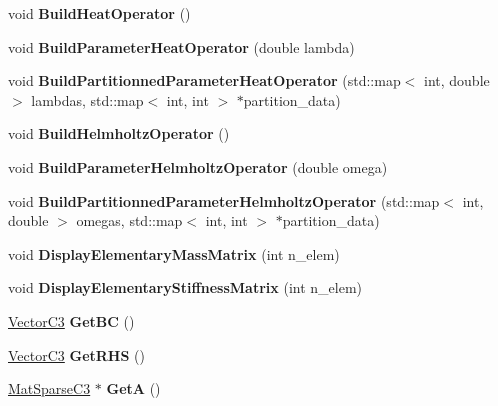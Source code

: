 \begin{DoxyCompactItemize}
\item 
void {\bfseries Build\+Heat\+Operator} ()\hypertarget{class_f_e_problem_a28324e797fb63c2eb6f1290961707c5c}{}\label{class_f_e_problem_a28324e797fb63c2eb6f1290961707c5c}

\item 
void {\bfseries Build\+Parameter\+Heat\+Operator} (double lambda)\hypertarget{class_f_e_problem_a7e5f1a4a65eb0d6aed9dbabf92bc0da8}{}\label{class_f_e_problem_a7e5f1a4a65eb0d6aed9dbabf92bc0da8}

\item 
void {\bfseries Build\+Partitionned\+Parameter\+Heat\+Operator} (std\+::map$<$ int, double $>$ lambdas, std\+::map$<$ int, int $>$ $\ast$partition\+\_\+data)\hypertarget{class_f_e_problem_a8f31694c860f6c4328435a03ba49a16f}{}\label{class_f_e_problem_a8f31694c860f6c4328435a03ba49a16f}

\item 
void {\bfseries Build\+Helmholtz\+Operator} ()\hypertarget{class_f_e_problem_abf351263b822451ef3a9e426c5a24fb3}{}\label{class_f_e_problem_abf351263b822451ef3a9e426c5a24fb3}

\item 
void {\bfseries Build\+Parameter\+Helmholtz\+Operator} (double omega)\hypertarget{class_f_e_problem_a47be6792b07ddfe598e9baab37b5d442}{}\label{class_f_e_problem_a47be6792b07ddfe598e9baab37b5d442}

\item 
void {\bfseries Build\+Partitionned\+Parameter\+Helmholtz\+Operator} (std\+::map$<$ int, double $>$ omegas, std\+::map$<$ int, int $>$ $\ast$partition\+\_\+data)\hypertarget{class_f_e_problem_a666ceb9dd40eb18d8f825e81a4946b96}{}\label{class_f_e_problem_a666ceb9dd40eb18d8f825e81a4946b96}

\item 
void {\bfseries Display\+Elementary\+Mass\+Matrix} (int n\+\_\+elem)\hypertarget{class_f_e_problem_a84a7d802bed7528c88c34ec7d7d9c243}{}\label{class_f_e_problem_a84a7d802bed7528c88c34ec7d7d9c243}

\item 
void {\bfseries Display\+Elementary\+Stiffness\+Matrix} (int n\+\_\+elem)\hypertarget{class_f_e_problem_a2c7f81c3c19f2084786c05fa62bb2a16}{}\label{class_f_e_problem_a2c7f81c3c19f2084786c05fa62bb2a16}

\item 
\hyperlink{class_vector_c3}{Vector\+C3} {\bfseries Get\+BC} ()\hypertarget{class_f_e_problem_ae35d33f28900ab65cfda40dadbc37032}{}\label{class_f_e_problem_ae35d33f28900ab65cfda40dadbc37032}

\item 
\hyperlink{class_vector_c3}{Vector\+C3} {\bfseries Get\+R\+HS} ()\hypertarget{class_f_e_problem_a8430129189603424a40ed0d5fe532cce}{}\label{class_f_e_problem_a8430129189603424a40ed0d5fe532cce}

\item 
\hyperlink{class_mat_sparse_c3}{Mat\+Sparse\+C3} $\ast$ {\bfseries GetA} ()\hypertarget{class_f_e_problem_ab8d3a04c8c349cc5071b2f2e234b9f89}{}\label{class_f_e_problem_ab8d3a04c8c349cc5071b2f2e234b9f89}

\end{DoxyCompactItemize}


